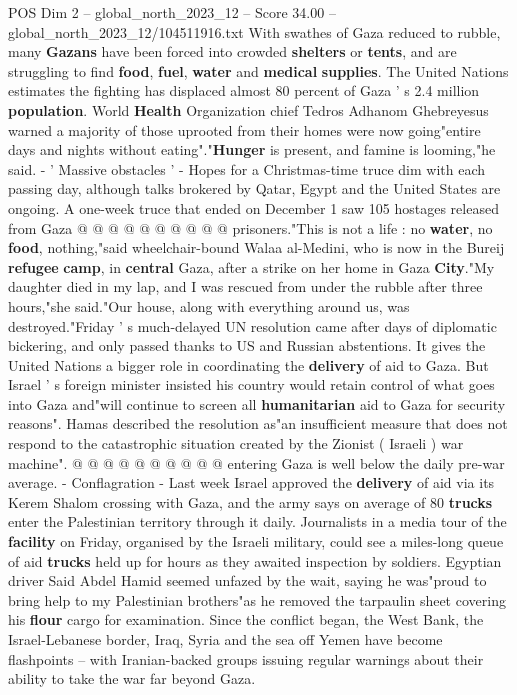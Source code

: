 \begin{textsample}{POS Dim 2 – global\_north\_2023\_12 – Score 34.00 – global\_north\_2023\_12/104511916.txt}
With swathes of Gaza reduced to rubble, many \textbf{Gazans} have been forced into crowded \textbf{shelters} or \textbf{tents}, and are struggling to find \textbf{food}, \textbf{fuel}, \textbf{water} and \textbf{medical} \textbf{supplies}.
The United Nations estimates the fighting has displaced almost 80 percent of Gaza ' s 2.4 million \textbf{population}.
World \textbf{Health} Organization chief Tedros Adhanom Ghebreyesus warned a majority of those uprooted from their homes were now going"entire days and nights without eating"."\textbf{Hunger} is present, and famine is looming,"he said. - ' Massive obstacles ' - Hopes for a Christmas-time truce dim with each passing day, although talks brokered by Qatar, Egypt and the United States are ongoing.
A one-week truce that ended on December 1 saw 105 hostages released from Gaza @ @ @ @ @ @ @ @ @ @ prisoners."This is not a life : no \textbf{water}, no \textbf{food}, nothing,"said wheelchair-bound Walaa al-Medini, who is now in the Bureij \textbf{refugee} \textbf{camp}, in \textbf{central} Gaza, after a strike on her home in Gaza \textbf{City}."My daughter died in my lap, and I was rescued from under the rubble after three hours,"she said."Our house, along with everything around us, was destroyed."Friday ' s much-delayed UN resolution came after days of diplomatic bickering, and only passed thanks to US and Russian abstentions.
It gives the United Nations a bigger role in coordinating the \textbf{delivery} of aid to Gaza.
But Israel ' s foreign minister insisted his country would retain control of what goes into Gaza and"will continue to screen all \textbf{humanitarian} aid to Gaza for security reasons".
Hamas described the resolution as"an insufficient measure that does not respond to the catastrophic situation created by the Zionist ( Israeli ) war machine". @ @ @ @ @ @ @ @ @ @ entering Gaza is well below the daily pre-war average. - Conflagration - Last week Israel approved the \textbf{delivery} of aid via its Kerem Shalom crossing with Gaza, and the army says on average of 80 \textbf{trucks} enter the Palestinian territory through it daily.
Journalists in a media tour of the \textbf{facility} on Friday, organised by the Israeli military, could see a miles-long queue of aid \textbf{trucks} held up for hours as they awaited inspection by soldiers.
Egyptian driver Said Abdel Hamid seemed unfazed by the wait, saying he was"proud to bring help to my Palestinian brothers"as he removed the tarpaulin sheet covering his \textbf{flour} cargo for examination.
Since the conflict began, the West Bank, the Israel-Lebanese border, Iraq, Syria and the sea off Yemen have become flashpoints -- with Iranian-backed groups issuing regular warnings about their ability to take the war far beyond Gaza.

\end{textsample}
